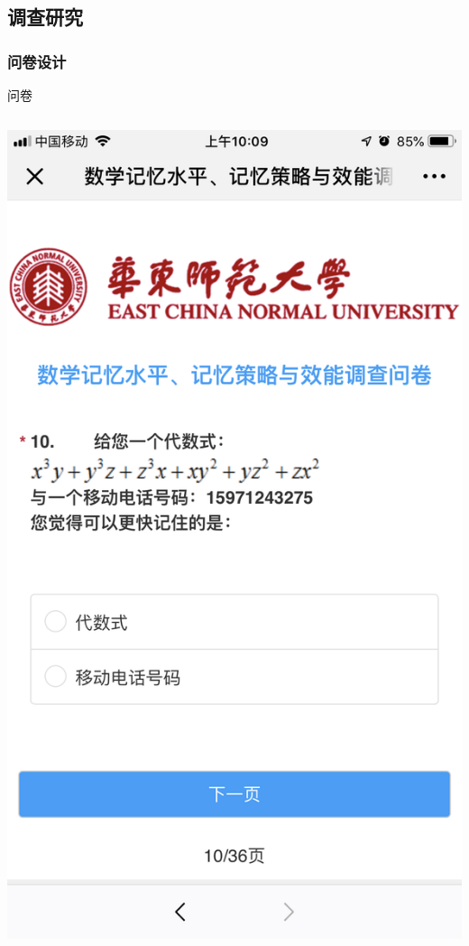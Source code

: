 \documentclass[serif]{beamer}
\begin{document}
    \subsection{调查研究}
    \subsubsection{问卷设计}
    \begin{frame}{问卷}
         \begin{columns}
         	\includegraphics[scale=0.09]{test10.png}
         

\end{columns}
\end{frame}
\end{document}
